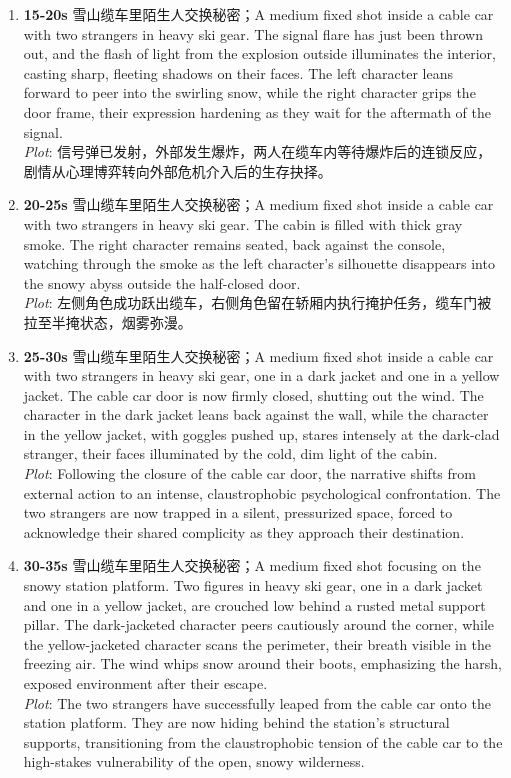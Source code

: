 \documentclass[11pt,a4paper]{article}
\begin{document}
\begin{enumerate}
\item \textbf{15-20s} 雪山缆车里陌生人交换秘密；A medium fixed shot inside a cable car with two strangers in heavy ski gear. The signal flare has just been thrown out, and the flash of light from the explosion outside illuminates the interior, casting sharp, fleeting shadows on their faces. The left character leans forward to peer into the swirling snow, while the right character grips the door frame, their expression hardening as they wait for the aftermath of the signal.\\\newline \textit{Plot}: 信号弹已发射，外部发生爆炸，两人在缆车内等待爆炸后的连锁反应，剧情从心理博弈转向外部危机介入后的生存抉择。
\item \textbf{20-25s} 雪山缆车里陌生人交换秘密；A medium fixed shot inside a cable car with two strangers in heavy ski gear. The cabin is filled with thick gray smoke. The right character remains seated, back against the console, watching through the smoke as the left character's silhouette disappears into the snowy abyss outside the half-closed door.\\\newline \textit{Plot}: 左侧角色成功跃出缆车，右侧角色留在轿厢内执行掩护任务，缆车门被拉至半掩状态，烟雾弥漫。
\item \textbf{25-30s} 雪山缆车里陌生人交换秘密；A medium fixed shot inside a cable car with two strangers in heavy ski gear, one in a dark jacket and one in a yellow jacket. The cable car door is now firmly closed, shutting out the wind. The character in the dark jacket leans back against the wall, while the character in the yellow jacket, with goggles pushed up, stares intensely at the dark-clad stranger, their faces illuminated by the cold, dim light of the cabin.\\\newline \textit{Plot}: Following the closure of the cable car door, the narrative shifts from external action to an intense, claustrophobic psychological confrontation. The two strangers are now trapped in a silent, pressurized space, forced to acknowledge their shared complicity as they approach their destination.
\item \textbf{30-35s} 雪山缆车里陌生人交换秘密；A medium fixed shot focusing on the snowy station platform. Two figures in heavy ski gear, one in a dark jacket and one in a yellow jacket, are crouched low behind a rusted metal support pillar. The dark-jacketed character peers cautiously around the corner, while the yellow-jacketed character scans the perimeter, their breath visible in the freezing air. The wind whips snow around their boots, emphasizing the harsh, exposed environment after their escape.\\\newline \textit{Plot}: The two strangers have successfully leaped from the cable car onto the station platform. They are now hiding behind the station's structural supports, transitioning from the claustrophobic tension of the cable car to the high-stakes vulnerability of the open, snowy wilderness.
\end{enumerate}
\end{document}
